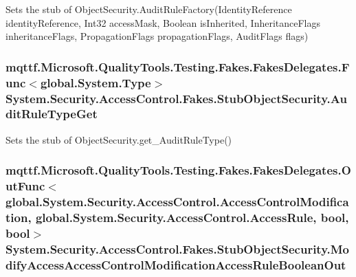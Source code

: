 Sets the stub of Object\-Security.\-Audit\-Rule\-Factory(\-Identity\-Reference identity\-Reference, Int32 access\-Mask, Boolean is\-Inherited, Inheritance\-Flags inheritance\-Flags, Propagation\-Flags propagation\-Flags, Audit\-Flags flags)

\hypertarget{class_system_1_1_security_1_1_access_control_1_1_fakes_1_1_stub_object_security_a135141cdf600a496c1cf430fe512649f}{
\subsubsection[{Audit\-Rule\-Type\-Get}]{\setlength{\rightskip}{0pt plus 5cm}mqttf.\-Microsoft.\-Quality\-Tools.\-Testing.\-Fakes.\-Fakes\-Delegates.\-Func$<$global.\-System.\-Type$>$ System.\-Security.\-Access\-Control.\-Fakes.\-Stub\-Object\-Security.\-Audit\-Rule\-Type\-Get}}\label{class_system_1_1_security_1_1_access_control_1_1_fakes_1_1_stub_object_security_a135141cdf600a496c1cf430fe512649f}


Sets the stub of Object\-Security.\-get\-\_\-\-Audit\-Rule\-Type()

\hypertarget{class_system_1_1_security_1_1_access_control_1_1_fakes_1_1_stub_object_security_ab81362fd347ce5103e2c463ea48ebd52}{
\subsubsection[{Modify\-Access\-Access\-Control\-Modification\-Access\-Rule\-Boolean\-Out}]{\setlength{\rightskip}{0pt plus 5cm}mqttf.\-Microsoft.\-Quality\-Tools.\-Testing.\-Fakes.\-Fakes\-Delegates.\-Out\-Func$<$global.\-System.\-Security.\-Access\-Control.\-Access\-Control\-Modification, global.\-System.\-Security.\-Access\-Control.\-Access\-Rule, bool, bool$>$ System.\-Security.\-Access\-Control.\-Fakes.\-Stub\-Object\-Security.\-Modify\-Access\-Access\-Control\-Modification\-Access\-Rule\-Boolean\-Out}}\label{class_system_1_1_security_1_1_access_control_1_1_fakes_1_1_stub_object_security_ab81362fd347ce5103e2c463ea48ebd52}


